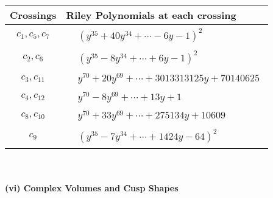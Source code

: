 \documentclass[1p]{elsarticle_modified}
\theoremstyle{definition}
\begin{document}
\begin{tabular}{m{50pt}|m{274pt}}
Crossings & \hspace{64pt}Riley Polynomials at each crossing \\
\hline $$\begin{aligned}c_{1},c_{5},c_{7}\end{aligned}$$&$\begin{aligned}
&(y^{35}+40 y^{34}+\cdots-6 y-1)^{2}
\end{aligned}$\\
\hline $$\begin{aligned}c_{2},c_{6}\end{aligned}$$&$\begin{aligned}
&(y^{35}-8 y^{34}+\cdots+6 y-1)^{2}
\end{aligned}$\\
\hline $$\begin{aligned}c_{3},c_{11}\end{aligned}$$&$\begin{aligned}
&y^{70}+20 y^{69}+\cdots+3013313125 y+70140625
\end{aligned}$\\
\hline $$\begin{aligned}c_{4},c_{12}\end{aligned}$$&$\begin{aligned}
&y^{70}-8 y^{69}+\cdots+13 y+1
\end{aligned}$\\
\hline $$\begin{aligned}c_{8},c_{10}\end{aligned}$$&$\begin{aligned}
&y^{70}+33 y^{69}+\cdots+275134 y+10609
\end{aligned}$\\
\hline $$\begin{aligned}c_{9}\end{aligned}$$&$\begin{aligned}
&(y^{35}-7 y^{34}+\cdots+1424 y-64)^{2}
\end{aligned}$\\
\hline
\end{tabular}\\~\\
\newpage\flushleft \textbf{(vi) Complex Volumes and Cusp Shapes}
\end{document}
